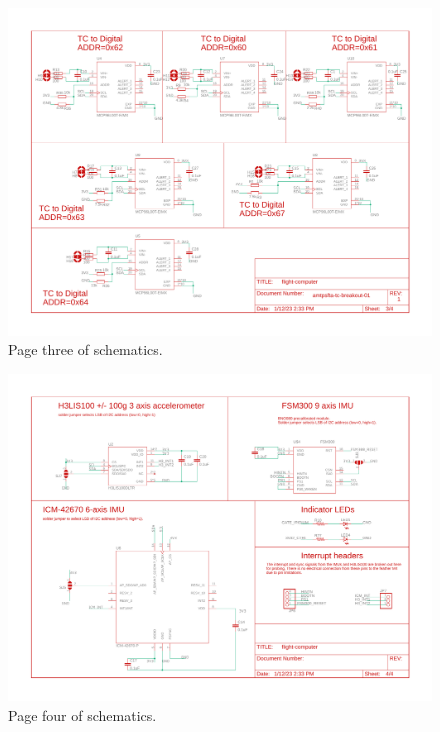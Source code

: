 \documentclass{article}
\begin{document}
\begin{figure}[H]
    \centering
    \includegraphics[width=\textwidth]{images/flight-computer-schematic-page3.pdf}
    \caption{Page three of schematics.}
    \label{fig:page1-3}
\end{figure}

\begin{figure}[H]
    \centering
    \includegraphics[width=\textwidth]{images/flight-computer-schematic-page4.pdf}
    \caption{Page four of schematics.}
    \label{fig:page1-4}
\end{figure}


\end{document}
